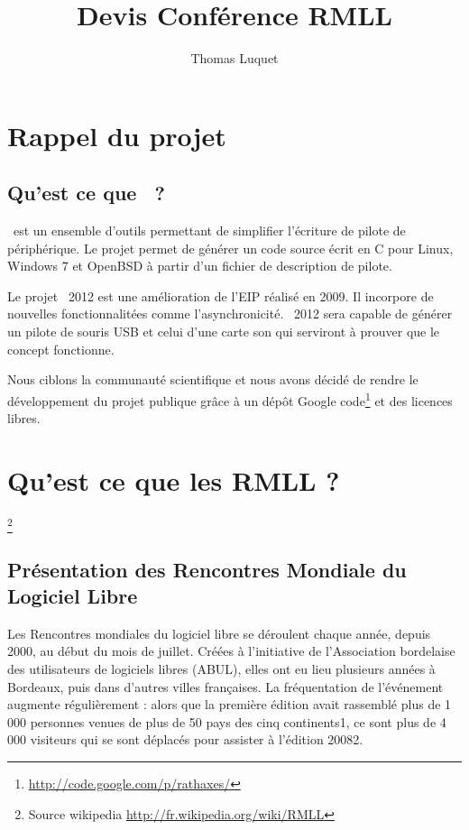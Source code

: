 \documentclass{rtxreport}
\author{Thomas Luquet}
\title{Devis Conférence RMLL}
\begin{document}
\maketitle

\rtxmaketitleblock

\tableofcontents

\chapter{Rappel du projet}

\section{Qu'est ce que \rtx\ ?}

\rtx\ est un ensemble d'outils permettant de simplifier l'écriture de pilote de
périphérique. Le projet permet de générer un code source écrit en C pour Linux,
Windows 7 et OpenBSD à partir d'un fichier de description de pilote.

Le projet \rtx\ 2012 est une amélioration de l'EIP réalisé en 2009. Il
incorpore de nouvelles fonctionnalitées comme l’asynchronicité. \rtx\ 2012 sera
capable de générer un pilote de souris USB et celui d'une carte son qui
serviront à prouver que le concept fonctionne.

Nous ciblons la communauté scientifique et nous avons décidé de rendre le
développement du projet publique grâce à un dépôt Google
code\footnote{\url{http://code.google.com/p/rathaxes/}} et des licences libres.



\chapter{Qu'est ce que les RMLL ?}\footnote{ Source wikipedia \url{http://fr.wikipedia.org/wiki/RMLL}}

\section{Présentation des Rencontres Mondiale du Logiciel Libre}


Les Rencontres mondiales du logiciel libre se déroulent chaque année, depuis 2000, au début du mois de juillet. Créées à l'initiative de l’Association bordelaise des utilisateurs de logiciels libres (ABUL), elles ont eu lieu plusieurs années à Bordeaux, puis dans d'autres villes françaises. La fréquentation de l'événement augmente régulièrement : alors que la première édition avait rassemblé plus de 1 000 personnes venues de plus de 50 pays des cinq continents1, ce sont plus de 4 000 visiteurs qui se sont déplacés pour assister à l'édition 20082.
\end{document}
